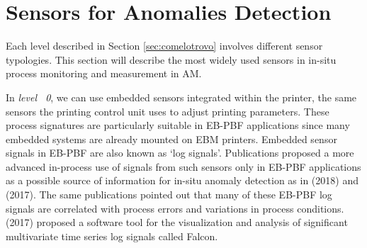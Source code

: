 
\section{Sensors for Anomalies Detection}
\label{sec:sensoriniiniini}
Each level described in Section \ref{sec:comelotrovo} involves different sensor typologies. This section will describe the most widely used sensors in in-situ process monitoring and measurement in AM. 

In \emph{level ~0}, we can use embedded sensors integrated within the printer, the same sensors the printing control unit uses to adjust printing parameters. These process signatures are particularly suitable in EB-PBF applications since many embedded systems are already mounted on EBM printers. Embedded sensor signals in EB-PBF are also known as ‘log signals’. Publications proposed a more advanced in-process use of signals from such sensors only in EB-PBF applications as a possible source of information for in-situ anomaly detection as in \citeauthor{grasso_data_2018} (2018) and \citeauthor{steed_falcon_2017} (2017). The same publications pointed out that many of these EB-PBF log signals are correlated with process errors and variations in process conditions. \citeauthor{steed_falcon_2017} (2017) proposed a software tool for the visualization and analysis of significant multivariate time series log signals called Falcon. 
